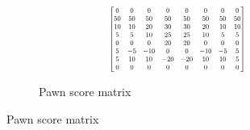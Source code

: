 \documentclass[a4paper,openany]{uantwerpenassignment}
\newcommand\scalemath[2]{\scalebox{#1}{\mbox{\ensuremath{\displaystyle #2}}}}
\begin{document}
\begin{figure}[h]
    \centering
    \begin{subfigure}{.3\textwidth}
        $$
		\scalemath{0.6}{
		\begin{bmatrix}
		0& 0& 0& 0& 0& 0& 0& 0\\
		50& 50& 50& 50& 50& 50& 50& 50\\
		10& 10& 20& 30& 30& 20& 10& 10\\
		5& 5& 10& 25& 25& 10& 5& 5\\
		0& 0& 0& 20& 20& 0& 0& 0\\
		5& -5& -10& 0& 0& -10& -5& 5\\
		5& 10& 10& -20& -20& 10& 10& 5\\
		0& 0& 0& 0& 0& 0& 0& 0
		\end{bmatrix}}
		$$
        \caption{Pawn score matrix}


\end{subfigure}
\end{figure}
\end{document}
